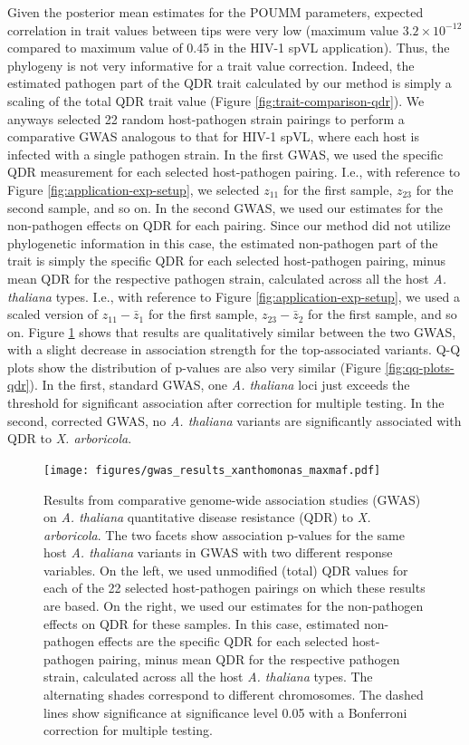 \documentclass[11pt]{article}
\begin{document}
\begin{linenumbers}
Given the posterior mean estimates for the POUMM parameters, expected correlation in trait values between tips were very low (maximum value $3.2 \times 10^{-12}$ compared to maximum value of 0.45 in the HIV-1 spVL application). Thus, the phylogeny is not very informative for a trait value correction. Indeed, the estimated pathogen part of the QDR trait calculated by our method is simply a scaling of the total QDR trait value (Figure \ref{fig:trait-comparison-qdr}). We anyways selected 22 random host-pathogen strain pairings to perform a comparative GWAS analogous to that for HIV-1 spVL, where each host is infected with a single pathogen strain. In the first GWAS, we used the specific QDR measurement for each selected host-pathogen pairing. I.e., with reference to Figure \ref{fig:application-exp-setup}, we selected $z_{11}$ for the first sample, $z_{23}$ for the second sample, and so on. In the second GWAS, we used our estimates for the non-pathogen effects on QDR for each pairing. Since our method did not utilize phylogenetic information in this case, the estimated non-pathogen part of the trait is simply the specific QDR for each selected host-pathogen pairing, minus mean QDR for the respective pathogen strain, calculated across all the host \emph{A. thaliana} types. I.e., with reference to Figure \ref{fig:application-exp-setup}, we used a scaled version of $z_{11} - \bar{z}_1$ for the first sample, $z_{23} - \bar{z}_2$ for the first sample, and so on. Figure \ref{fig:gwas-results-qdr} shows that results are qualitatively similar between the two GWAS, with a slight decrease in association strength for the top-associated variants. Q-Q plots show the distribution of p-values are also very similar (Figure \ref{fig:qq-plots-qdr}). In the first, standard GWAS, one \emph{A. thaliana} loci just exceeds the threshold for significant association after correction for multiple testing. In the second, corrected GWAS, no \emph{A. thaliana} variants are significantly associated with QDR to \emph{X. arboricola}.

\begin{figure}[H]
\begin{center}
    \texttt{[image: figures/gwas\_results\_xanthomonas\_maxmaf.pdf]}
	\caption{Results from comparative genome-wide association studies (GWAS) on \emph{A. thaliana} quantitative disease resistance (QDR) to \emph{X. arboricola}. The two facets show association p-values for the same host \emph{A. thaliana} variants in GWAS with two different response variables. On the left, we used unmodified (total) QDR values for each of the 22 selected host-pathogen pairings on which these results are based. On the right, we used our estimates for the non-pathogen effects on QDR for these samples. In this case, estimated non-pathogen effects are the specific QDR for each selected host-pathogen pairing, minus mean QDR for the respective pathogen strain, calculated across all the host \emph{A. thaliana} types. The alternating shades correspond to different chromosomes. The dashed lines show significance at significance level 0.05 with a Bonferroni correction for multiple testing.}
	\label{fig:gwas-results-qdr}
	\end{center}
\end{figure}


\end{linenumbers}
\end{document}
